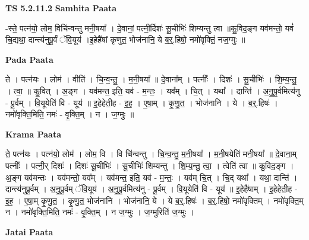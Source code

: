\documentclass[17pt]{extarticle}
\begin{document}
\textbf{TS 5.2.11.2 } \newline
\textbf{Samhita Paata} \newline

-स्ते॒ पत्न॑यो॒ लोम॒ विचि॑न्वन्तु मनी॒षया᳚ । दे॒वानां॒ पत्नी॒र्दिशः॑ सू॒चीभिः॑ शिम्यन्तु त्वा ॥कु॒विद॒ङ्ग यव॑मन्तो॒ यवं॑ चि॒द्यथा॒ दान्त्य॑नुपू॒र्वं ॅवि॒यूय॑ ।इ॒हेहै॑षां कृणुत॒ भोज॑नानि॒ ये ब॒र्॒.हिषो॒ नमो॑वृक्तिं॒ नज॒ग्मुः ॥ \newline

\textbf{Pada Paata} \newline

ते । पत्न॑यः । लोम॑ । वीति॑ । चि॒न्व॒न्तु॒ । म॒नी॒षया᳚ ॥ दे॒वाना᳚म् । पत्नीः᳚ । दिशः॑ । सू॒चीभिः॑ । शि॒म्य॒न्तु॒ । त्वा॒ ॥ कु॒वित् । अ॒ङ्ग । यव॑मन्त॒ इति॒ यव॑ - म॒न्तः॒ । यव᳚म् । चि॒त् । यथा᳚ । दान्ति॑ । अ॒नु॒पू॒र्वमित्य॑नु - पू॒र्वम् । वि॒यूयेति॑ वि - यूय॑ ॥ इ॒हेहेती॒ह - इ॒ह॒ । ए॒षा॒म् । कृ॒णु॒त॒ । भोज॑नानि । ये । ब॒र्॒.हिषः॑ । नमो॑वृक्ति॒मिति॒ नमः॑ - वृ॒क्ति॒म् । न । ज॒ग्मुः ॥  \newline


\textbf{Krama Paata} \newline

ते॒ पत्न॑यः । पत्न॑यो॒ लोम॑ । लोम॒ वि । वि चि॑न्वन्तु । चि॒न्व॒न्तु॒ म॒नी॒षया᳚ । म॒नी॒षयेति॑ मनी॒षया᳚ ॥ दे॒वाना॒म् पत्नीः᳚ । पत्नी॒र् दिशः॑ । दिशः॑ सू॒चीभिः॑ । सू॒चीभिः॑ शिम्यन्तु । शि॒म्य॒न्तु॒ त्वा॒ । त्वेति॑ त्वा ॥ कु॒विद॒ङ्ग । अ॒ङ्ग यव॑मन्तः । यव॑मन्तो॒ यव᳚म् । यव॑मन्त॒ इति॒ यव॑ - म॒न्तः॒ । यव॑म् चि॒त् । चि॒द् यथा᳚ । यथा॒ दान्ति॑ । दान्त्य॑नुपू॒र्वम् । अ॒नु॒पू॒र्वम् ॅवि॒यूय॑ । अ॒नु॒पू॒र्वमित्य॑नु - पू॒र्वम् । वि॒यूयेति॑ वि - यूय॑ ॥ इ॒हेहै॑षाम् । इ॒हेहेती॒ह - इ॒ह॒ । ए॒षा॒म् कृ॒णु॒त॒ । कृ॒णु॒त॒ भोज॑नानि । भोज॑नानि॒ ये । ये ब॒र्॒.हिषः॑ । ब॒र्॒.हिषो॒ नमो॑वृक्तिम् । नमो॑वृक्ति॒म् न । नमो॑वृक्ति॒मिति॒ नमः॑ - वृ॒क्ति॒म् । न ज॒ग्मुः । ज॒ग्मुरिति॑ ज॒ग्मुः । \newline

\textbf{Jatai Paata} \newline
\end{document}
